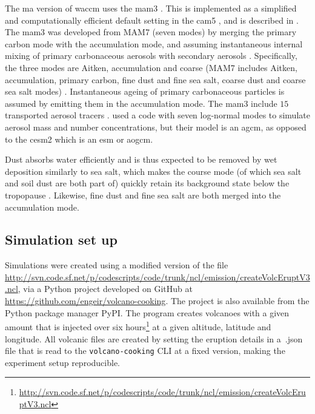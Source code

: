 \documentclass{ametsocV5}
\begin{document}
The \ac{ma} version of \ac{waccm} uses the \ac{mam3} \citep{gettleman2019}. This is
implemented as a simplified and computationally efficient default setting in the
\ac{cam5} \citep{liu2016}, and is described in \citet{liu2012}. The \ac{mam3} was
developed from MAM7 (seven modes) by merging the primary carbon mode with the
accumulation mode, and assuming instantaneous internal mixing of primary carbonaceous
aerosols with secondary aerosols \citep{liu2016}. Specifically, the three modes are
Aitken, accumulation and coarse (MAM7 includes Aitken, accumulation, primary carbon,
fine dust and fine sea salt, coarse dust and coarse sea salt modes) \citep{liu2016}.
Instantaneous ageing of primary carbonaceous particles is assumed by emitting them in
the accumulation mode. The \ac{mam3} include \(15\) transported aerosol tracers
\citep{liu2016}. \citet{marshall2019, marshall2020, marshall2021} used a code with seven
log-normal modes to simulate aerosol mass and number concentrations, but their model is
an \ac{agcm}, as opposed to the \ac{cesm2} which is an \ac{esm} or \ac{aogcm}.

Dust absorbs water efficiently and is thus expected to be removed by wet deposition
similarly to sea salt, which makes the course mode (of which sea salt and soil dust are
both part of) quickly retain its background state below the tropopause \citep{liu2012}.
Likewise, fine dust and fine sea salt are both merged into the accumulation mode.


\subsection{Simulation set up}

Simulations were created using a modified version of the file
\url{http://svn.code.sf.net/p/codescripts/code/trunk/ncl/emission/createVolcEruptV3.ncl},
via a Python project developed on GitHub at
\url{https://github.com/engeir/volcano-cooking}. The project is also available from the
Python package manager PyPI\@. The program creates volcanoes with a given 
amount that is injected over six
hours\footnote{\url{http://svn.code.sf.net/p/codescripts/code/trunk/ncl/emission/createVolcEruptV3.ncl}}
at a given altitude, latitude and longitude. All volcanic  files are created by
setting the eruption details in a~.json file that is read to the
\texttt{volcano-cooking} CLI at a fixed version, making the experiment setup
reproducible.
\end{document}
